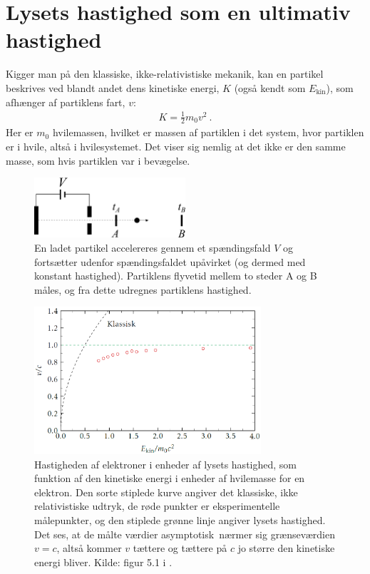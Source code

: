 \section{Lysets hastighed som en ultimativ hastighed}

Kigger man på den klassiske, ikke-relativistiske mekanik, kan en partikel beskrives ved blandt andet dens kinetiske energi, $K$ (også kendt som $E_{\mathrm{kin}}$), som afhænger af partiklens fart, $v$:
\begin{align} \label{eq:KineticEnergy}
K = \frac{1}{2}m_0v^2 \: .
\end{align}
Her er $m_0$ hvilemassen, hvilket er massen af partiklen i det system, hvor partiklen er i hvile, altså i hvilesystemet. Det viser sig nemlig at det ikke er den samme masse, som hvis partiklen var i bevægelse.

\begin{figure}[t]
    \centering
    \includegraphics[width=0.5\textwidth]{SR/billeder/EksperimentalSetupElectronVelocity.pdf}
    \caption{En ladet partikel accelereres gennem et spændingsfald $V$ og fortsætter udenfor spændingsfaldet upåvirket (og dermed med konstant hastighed). Partiklens flyvetid mellem to steder A og B måles, og fra dette udregnes partiklens hastighed.}
    \label{fig:ExperimentElectronVelocity}
\end{figure}
%
\begin{figure}[t]
    \centering
    \includegraphics[width=0.75\textwidth]{SR/billeder/ClassicalVsRelativisticVelocityUggerhoej.PNG}
    \caption[]{Hastigheden af elektroner i enheder af lysets hastighed, som funktion af den kinetiske energi i enheder af hvilemasse for en elektron. Den sorte stiplede kurve angiver det klassiske, ikke relativistiske udtryk, de røde punkter er eksperimentelle målepunkter, og den stiplede grønne linje angiver lysets hastighed. Det ses, at de målte værdier asymptotisk\footnotemark~nærmer sig grænseværdien $v = c$, altså kommer $v$ tættere og tættere på $c$ jo større den kinetiske energi bliver. Kilde: figur 5.1 i \cite{uggerhojSpecielRelativitetsteori2016}.}
    \label{fig:ClassicalVsRelativisticVelocity}
\end{figure}

